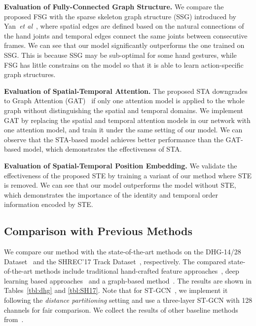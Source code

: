 \documentclass{bmvc2k}
\def\etal{\emph{et al}\bmvaOneDot}
\begin{document}
\textbf{Evaluation of Fully-Connected Graph Structure.} We compare the proposed FSG with the sparse skeleton graph structure (SSG) introduced by Yan~\etal~\cite{yan2018spatial}, where spatial edges are defined based on the natural connections of the hand joints and temporal edges connect the same joints between consecutive frames. We can see that our model significantly outperforms the one trained on SSG. This is because SSG may be sub-optimal for some hand gestures, while FSG has little constrains on the model so that it is able to learn action-specific graph structures.

\textbf{Evaluation of Spatial-Temporal Attention.} The proposed STA downgrades to Graph Attention (GAT)~\cite{velivckovic2017graph} if only one attention model is applied to the whole graph without distinguishing the spatial and temporal domains. We implement GAT by replacing the spatial and temporal attention models in our network with one attention model, and train it under the same setting of our model. We can observe that the STA-based model achieves better performance than the GAT-based model, which demonstrates the effectiveness of STA.

\textbf{Evaluation of Spatial-Temporal Position Embedding.} We validate the effectiveness of the proposed STE by training a variant of our method where STE is removed. We can see that our model outperforms the model without STE, which demonstrates the importance of the identity and temporal order information encoded by STE.




\subsection{Comparison with Previous Methods}
\label{sec:comparison}

We compare our method with the state-of-the-art methods on the DHG-14/28 Dataset~\cite{de2016skeleton} and the SHREC'17 Track Dataset~\cite{de2017shrec}, respectively. The compared state-of-the-art methods include traditional hand-crafted feature approaches~\cite{chen2017motion,oreifej2013hon4d,devanne20153,ohn2013joint,de2017dynamic,de2016skeleton,caputo2018comparing,boulahia2017dynamic}, deep learning based approaches~\cite{nunez2018convolutional,hou2018spatial,de2017shrec} and a graph-based method~\cite{yan2018spatial}. The results are shown in Tables~\ref{tbl:dhg} and \ref{tbl:SH17}. Note that for ST-GCN~\cite{yan2018spatial}, we implement it following the \emph{distance partitioning} setting and use a three-layer ST-GCN with 128 channels for fair comparison. We collect the results of other baseline methods from~\cite{hou2018spatial}.
\end{document}
